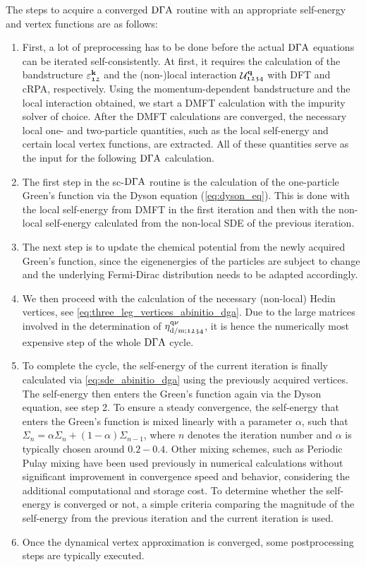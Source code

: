 \documentclass[../../main.tex]{subfiles}
\begin{document}
The steps to acquire a converged $\text{D}\Gamma\text{A}$ routine with an appropriate self-energy and vertex functions are as follows:
\begin{enumerate}
	\item First, a lot of preprocessing has to be done before the actual $\text{D}\Gamma\text{A}$ equations can be iterated self-consistently. At first, it requires the calculation of the bandstructure $\varepsilon^{\textbf{k}}_{\mathfrak{12}}$ and the (non-)local interaction $\mathcal{U}^{\textbf{q}}_{\mathfrak{1234}}$ with DFT and cRPA, respectively. Using the momentum-dependent bandstructure and the local interaction obtained, we start a DMFT calculation with the impurity solver of choice. After the DMFT calculations are converged, the necessary local one- and two-particle quantities, such as the local self-energy and certain local vertex functions, are extracted. All of these quantities serve as the input for the following $\text{D}\Gamma\text{A}$ calculation.
	\item The first step in the sc-$\text{D}\Gamma\text{A}$ routine is the calculation of the one-particle Green's function via the Dyson equation (\ref{eq:dyson_eq}). This is done with the local self-energy from DMFT in the first iteration and then with the non-local self-energy calculated from the non-local SDE of the previous iteration.
	\item The next step is to update the chemical potential from the newly acquired Green’s function, since the eigenenergies of the particles are subject to change and the underlying Fermi-Dirac distribution needs to be adapted accordingly.
	\item We then proceed with the calculation of the necessary (non-local) Hedin vertices, see \eqref{eq:three_leg_vertices_abinitio_dga}. Due to the large matrices involved in the determination of $\eta^{\text{q}\nu}_{\text{d}/\text{m};\mathfrak{1234}}$, it is hence the numerically most expensive step of the whole $\text{D}\Gamma\text{A}$ cycle.
	\item To complete the cycle, the self-energy of the current iteration is finally calculated via \eqref{eq:sde_abinitio_dga} using the previously acquired vertices. The self-energy then enters the Green's function again via the Dyson equation, see step 2. To ensure a steady convergence, the self-energy that enters the Green's function is mixed linearly with a parameter $\alpha$, such that $\Sigma_n=\alpha\Sigma_n + (1-\alpha)\Sigma_{n-1}$, where $n$ denotes the iteration number and $\alpha$ is typically chosen around $0.2-0.4$. Other mixing schemes, such as Periodic Pulay mixing \cite{pulay} have been used previously in numerical calculations \cite{my bac thesis} without significant improvement in convergence speed and behavior, considering the additional computational and storage cost. To determine whether the self-energy is converged or not, a simple criteria comparing the magnitude of the self-energy from the previous iteration and the current iteration is used.
	\item Once the dynamical vertex approximation is converged, some postprocessing steps are typically executed.
\end{enumerate}
\end{document}
